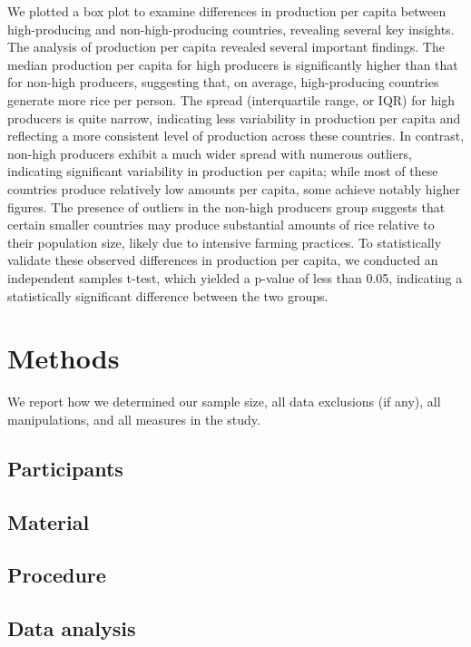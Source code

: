 \documentclass[
  man]{apa6}
\begin{document}
We plotted a box plot to examine differences in production per capita between high-producing and non-high-producing countries, revealing several key insights. The analysis of production per capita revealed several important findings. The median production per capita for high producers is significantly higher than that for non-high producers, suggesting that, on average, high-producing countries generate more rice per person. The spread (interquartile range, or IQR) for high producers is quite narrow, indicating less variability in production per capita and reflecting a more consistent level of production across these countries. In contrast, non-high producers exhibit a much wider spread with numerous outliers, indicating significant variability in production per capita; while most of these countries produce relatively low amounts per capita, some achieve notably higher figures. The presence of outliers in the non-high producers group suggests that certain smaller countries may produce substantial amounts of rice relative to their population size, likely due to intensive farming practices. To statistically validate these observed differences in production per capita, we conducted an independent samples t-test, which yielded a p-value of less than 0.05, indicating a statistically significant difference between the two groups.

\section{Methods}\label{methods}

We report how we determined our sample size, all data exclusions (if any), all manipulations, and all measures in the study.

\subsection{Participants}\label{participants}

\subsection{Material}\label{material}

\subsection{Procedure}\label{procedure}

\subsection{Data analysis}\label{data-analysis}
\end{document}
